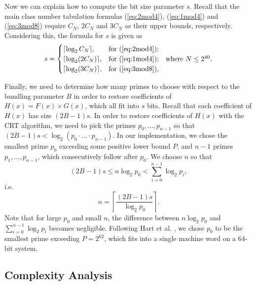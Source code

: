\documentclass{mcom-l}
\theoremstyle{definition}
\begin{document}
Now we can explain how to compute the bit size parameter $s$. Recall
that the main class number tabulation formulas (\ref{eq:2mod4}),
(\ref{eq:1mod4}) and (\ref{eq:3mod8}) require $C_N$, $2C_N$ and $3C_N$
as their upper bounds, respectively. Considering this, the formula for
$s$ is given as
\begin{equation} \label{eq:s}
s = \begin{cases}
\lceil\log_2C_N\rceil, & \textnormal{for (\ref{eq:2mod4})};\\
\lceil\log_2(2C_N)\rceil, & \textnormal{for (\ref{eq:1mod4});} \,\,\,\,\,\, \textnormal{where $N \leq 2^{40}$.}\\
\lceil\log_2(3C_N)\rceil, & \textnormal{for (\ref{eq:3mod8}),}
\end{cases}
\end{equation}

Finally, we need to determine how many primes to choose with respect
to the bundling parameter $B$ in order to restore coefficients of
$H(x) = F(x) \times G(x)$, which all fit into $s$ bits. Recall that
each coefficient of $H(x)$ has size $(2B - 1)s$. In order to restore
coefficients of $H(x)$ with the CRT algorithm, we need to pick the
primes $p_0, \ldots, p_{n-1}$ so that $(2B-1)s < \log_2(p_0 \cdot
\ldots \cdot p_{n-1})$. In our implementation, we chose the smallest
prime $p_0$ exceeding some positive lower bound $P$, and $n - 1$
primes $p_1, \ldots, p_{n-1}$, which consecutively follow after
$p_0$. We choose $n$ so that
$$
(2B-1)s \leq n\log_2p_0 < \sum_{i = 0}^{n-1} \log_2p_i,
$$
i.e.\
\begin{equation} \label{eq:n}
n = \left\lceil\frac{(2B - 1)s}{\log_2 p_0}\right\rceil.
\end{equation}
Note that for large $p_0$ and small $n$, the difference between
$n\log_2p_0$ and $\sum_{i = 0}^{n-1} \log_2p_i$ becomes
negligible. Following Hart et al. \cite{hart}, we chose $p_0$ to be
the smallest prime exceeding $P = 2^{62}$, which fits into a single
machine word on a 64-bit system.

\subsection{Complexity Analysis} \label{subsec:complexity}
\end{document}
